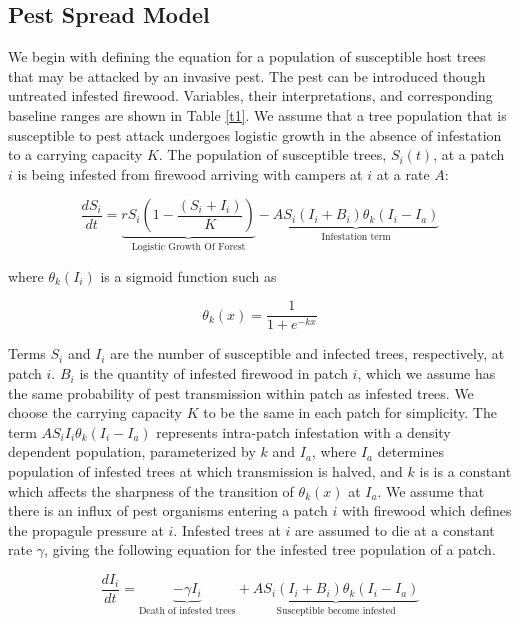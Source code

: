 \subsection{Pest Spread Model}

 We begin with defining the equation for a population of susceptible host trees that may be attacked by an invasive pest. The pest can be introduced though untreated infested firewood. Variables, their interpretations, and corresponding baseline ranges are shown in Table \ref{t1}. We assume that a tree population that is susceptible to pest attack undergoes logistic growth in the absence of infestation to a carrying capacity $K$. The population of susceptible trees, $S_i(t)$, at a patch $i$ is being infested from firewood arriving with campers at $i$ at a rate $A$: 

\begin{equation}
\frac{d S_i}{dt} = \underbrace{ r S_i\left(1 - \frac{(S_i + I_i)}{K}\right)}_{\text{Logistic Growth Of Forest}} - \underbrace{A S_i (I_i + B_i)\theta_k(I_i - I_a)}_{\text{Infestation term}}
\label{S_1}
\end{equation}

where $\theta_k(I_i)$ is a sigmoid function such as

\begin{equation}
    \theta_k(x) = \frac{1}{1 + e^{-k x}}
\end{equation}

 Terms $S_i$ and $I_i$ are the number of susceptible and infected trees, respectively, at patch $i$. $B_i$ is the quantity of infested firewood in patch $i$, which we assume has the same probability of pest transmission within patch as infested trees. We choose the carrying capacity $K$ to be the same in each patch for simplicity. The term $A S_i I_i\theta_k(I_i - I_a)$ represents intra-patch infestation with a density dependent population, parameterized by $k$ and $I_a$, where $I_a$ determines population of infested trees at which transmission is halved, and $k$ is is a constant which affects the sharpness of the transition of $\theta_k(x)$ at $I_a$. We assume that there is an influx of pest organisms entering a patch $i$ with firewood which defines the propagule pressure at $i$. Infested trees at $i$ are assumed to die at a constant rate $\gamma$, giving the following equation for the infested tree population of a patch.


\begin{equation}
\frac{d I_i}{dt} = \underbrace{-\gamma I_i}_{\text{Death of infested trees}} + \underbrace{A S_i (I_i + B_i)\theta_k(I_i - I_a)}_{\text{Susceptible become infested}}
\end{equation}

